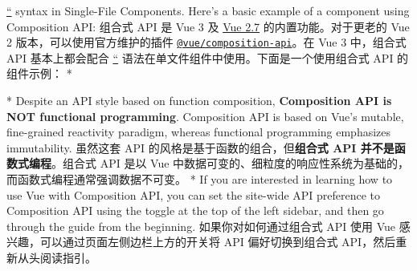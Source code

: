 \begin{paracol}{2}
\href{https://vuejs.org/api/sfc-script-setup.html}{``} syntax in
Single-File Components. Here's a basic example of a component using
Composition API:
\switchcolumn
组合式 API 是 Vue 3 及
\href{https://blog.vuejs.org/posts/vue-2-7-naruto.html}{Vue 2.7}
的内置功能。对于更老的 Vue 2 版本，可以使用官方维护的插件
\href{https://github.com/vuejs/composition-api}{\texttt{@vue/composition-api}}。在
Vue 3 中，组合式 API 基本上都会配合
\href{https://cn.vuejs.org/api/sfc-script-setup.html}{``}
语法在单文件组件中使用。下面是一个使用组合式 API 的组件示例：
\switchcolumn[0]*%
\switchcolumn
{}
\switchcolumn[0]*%
Despite an API style based on function composition, \textbf{Composition
API is NOT functional programming}. Composition API is based on Vue's
mutable, fine-grained reactivity paradigm, whereas functional
programming emphasizes immutability.
\switchcolumn
虽然这套 API 的风格是基于函数的组合，但\textbf{组合式 API
并不是函数式编程}。组合式 API 是以 Vue
中数据可变的、细粒度的响应性系统为基础的，而函数式编程通常强调数据不可变。
\switchcolumn[0]*%
If you are interested in learning how to use Vue with Composition API,
you can set the site-wide API preference to Composition API using the
toggle at the top of the left sidebar, and then go through the guide
from the beginning.
\switchcolumn
如果你对如何通过组合式 API 使用 Vue
感兴趣，可以通过页面左侧边栏上方的开关将 API 偏好切换到组合式
API，然后重新从头阅读指引。
\end{paracol}



